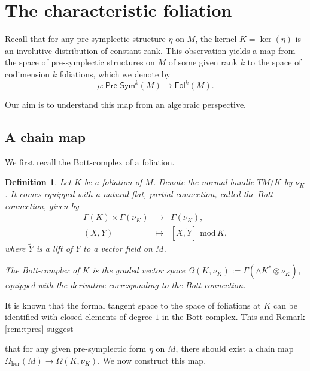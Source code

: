\documentclass[11pt,thmsa]{amsart}
\newtheorem{definition}[theorem]{Definition}
\theoremstyle{definition}
\newcommand{\Presym}{\mathsf{Pre}\textrm{-}\mathsf{Sym}}
\newcommand{\hor}{\mathrm{hor}}
\newcommand{\Foliations}{\mathsf{Fol}}
\begin{document}
{ 

\section{\textsf{The characteristic foliation}}
\label{section: characteristic foliation}

 

Recall that for any pre-symplectic structure $\eta$
on $M$, the kernel $K=\ker(\eta)$ is an involutive distribution of constant rank. This observation yields a map
from the space of pre-symplectic structures on $M$ of some given rank $k$
to the space of codimension $k$ foliations, which we denote by
$$ \rho: \Presym^k(M) \to \Foliations^k(M).$$

Our aim is to understand this map from an algebraic perspective.

\subsection{A chain map}\label{subsection: foliations - tangent map}



We first recall the Bott-complex of a foliation.
\begin{definition}\label{def:BottConn}
Let $K$ be a foliation of $M$. Denote the normal bundle $TM/K$ by $\nu_K$. It comes equipped with a natural flat, partial connection, called
the Bott-connection, given by
\begin{eqnarray*}
\Gamma(K)\times \Gamma(\nu_K) & \to & \Gamma(\nu_K),\\
(X,Y) & \mapsto & [X, \tilde{Y}] \,\, \mathrm{mod} \, K,
\end{eqnarray*}
where $\tilde{Y}$ is a lift of $Y$ to a vector field on $M$.

The \emph{Bott-complex} of $K$ is the graded vector space
$\Omega(K,\nu_K):=\Gamma(\wedge K^* \otimes \nu_K)$,
equipped with the derivative corresponding to the Bott-connection.
\end{definition}

It is known that the formal tangent space to
the space of foliations at $K$ can be identified with closed elements
of degree $1$
in the Bott-complex. This and Remark \ref{rem:tpres} 
suggest} that for any given pre-symplectic form $\eta$ on $M$, there should exist a chain map $\Omega_\hor(M) \to \Omega(K,\nu_K)$. We now construct this map.
 
\end{document}
